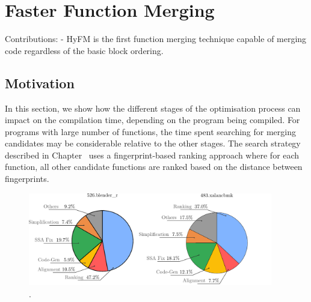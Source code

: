 
\chapter{Faster Function Merging} \label{chp:fastfm}




Contributions:
- HyFM is the first function merging technique capable of merging code regardless of the basic block ordering.

\section{Motivation}


In this section, we show how the different stages of the optimisation process can impact on the compilation time, depending on the program being compiled.
For programs with large number of functions, the time spent searching for merging candidates may be considerable relative to the other stages.
The search strategy described in Chapter~\cite{chp:cgo19} uses a fingerprint-based ranking approach where for each function, all other candidate functions are ranked based on the distance between fingerprints.

\begin{figure}[h]
  \centering
  \includegraphics[width=0.95\textwidth]{src/fastfm/figs/compilation-breakdown-motivation-ranking.pdf}
  \caption{.}
  \label{fig:compilation-breakdown-motivation}
\end{figure}


